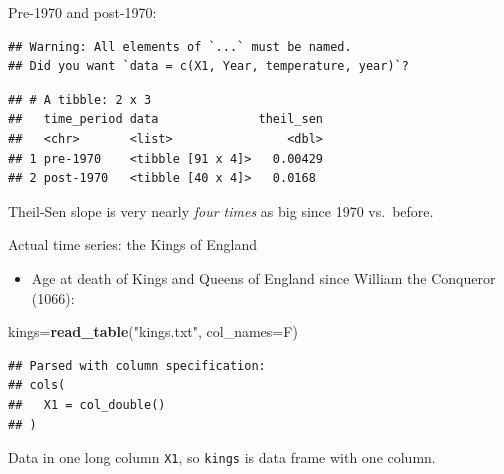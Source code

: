 \documentclass[
  ignorenonframetext,
]{beamer}
\newenvironment{Shaded}{\begin{snugshade}}{\end{snugshade}}
\newcommand{\DataTypeTok}[1]{\textcolor[rgb]{0.13,0.29,0.53}{#1}}
\newcommand{\DecValTok}[1]{\textcolor[rgb]{0.00,0.00,0.81}{#1}}
\newcommand{\KeywordTok}[1]{\textcolor[rgb]{0.13,0.29,0.53}{\textbf{#1}}}
\newcommand{\NormalTok}[1]{#1}
\newcommand{\OperatorTok}[1]{\textcolor[rgb]{0.81,0.36,0.00}{\textbf{#1}}}
\newcommand{\StringTok}[1]{\textcolor[rgb]{0.31,0.60,0.02}{#1}}
\providecommand{\tightlist}{%
  \setlength{\itemsep}{0pt}\setlength{\parskip}{0pt}}
\begin{document}
\begin{frame}[fragile]{Pre-1970 and post-1970:}
\protect\hypertarget{pre-1970-and-post-1970}{}

\begin{Shaded}
\end{Shaded}

\begin{verbatim}
## Warning: All elements of `...` must be named.
## Did you want `data = c(X1, Year, temperature, year)`?
\end{verbatim}

\begin{verbatim}
## # A tibble: 2 x 3
##   time_period data              theil_sen
##   <chr>       <list>                <dbl>
## 1 pre-1970    <tibble [91 x 4]>   0.00429
## 2 post-1970   <tibble [40 x 4]>   0.0168
\end{verbatim}

Theil-Sen slope is very nearly \emph{four times} as big since 1970
vs.~before.

\end{frame}

\begin{frame}[fragile]{Actual time series: the Kings of England}
\protect\hypertarget{actual-time-series-the-kings-of-england}{}

\begin{itemize}
\tightlist
\item
  Age at death of Kings and Queens of England since William the
  Conqueror (1066):
\end{itemize}

\begin{Shaded}
\begin{Highlighting}[]
\NormalTok{kings=}\KeywordTok{read_table}\NormalTok{(}\StringTok{"kings.txt"}\NormalTok{, }\DataTypeTok{col_names=}\NormalTok{F)}
\end{Highlighting}
\end{Shaded}

\begin{verbatim}
## Parsed with column specification:
## cols(
##   X1 = col_double()
## )
\end{verbatim}

Data in one long column \texttt{X1}, so \texttt{kings} is data frame
with one column.

\end{frame}
\end{document}
